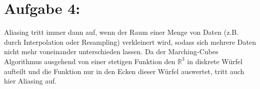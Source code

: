 \section*{Aufgabe 4:}
Aliasing tritt immer dann auf, wenn der Raum einer Menge von Daten (z.B. durch Interpolation oder Resampling) verkleinert wird, sodass sich mehrere Daten nicht mehr voneinander unterschieden lassen.
Da der Marching-Cubes Algorithmus ausgehend von einer stetigen Funktion den $\mathbb{R}^3$ in diskrete Würfel aufteilt und die Funktion nur in den Ecken dieser Würfel auswertet, tritt auch hier Aliasing auf.